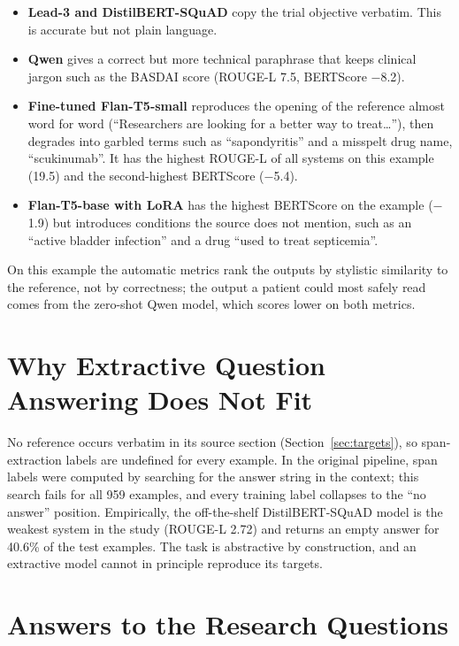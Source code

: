 \begin{itemize}
    \item \textbf{Lead-3 and DistilBERT-SQuAD} copy the trial objective verbatim. This is accurate but not plain language.
    \item \textbf{Qwen} gives a correct but more technical paraphrase that keeps clinical jargon such as the BASDAI score (ROUGE-L 7.5, BERTScore $-$8.2).
    \item \textbf{Fine-tuned Flan-T5-small} reproduces the opening of the reference almost word for word (``Researchers are looking for a better way to treat\ldots''), then degrades into garbled terms such as ``sapondyritis'' and a misspelt drug name, ``scukinumab''. It has the highest ROUGE-L of all systems on this example (19.5) and the second-highest BERTScore ($-$5.4).
    \item \textbf{Flan-T5-base with LoRA} has the highest BERTScore on the example ($-$1.9) but introduces conditions the source does not mention, such as an ``active bladder infection'' and a drug ``used to treat septicemia''.
\end{itemize}

On this example the automatic metrics rank the outputs by stylistic similarity to the reference, not by correctness; the output a patient could most safely read comes from the zero-shot Qwen model, which scores lower on both metrics.

\section{Why Extractive Question Answering Does Not Fit}
\label{sec:extractive}

No reference occurs verbatim in its source section (Section~\ref{sec:targets}), so span-extraction labels are undefined for every example. In the original pipeline, span labels were computed by searching for the answer string in the context; this search fails for all 959 examples, and every training label collapses to the ``no answer'' position. Empirically, the off-the-shelf DistilBERT-SQuAD model is the weakest system in the study (ROUGE-L 2.72) and returns an empty answer for 40.6\% of the test examples. The task is abstractive by construction, and an extractive model cannot in principle reproduce its targets.

\section{Answers to the Research Questions}

